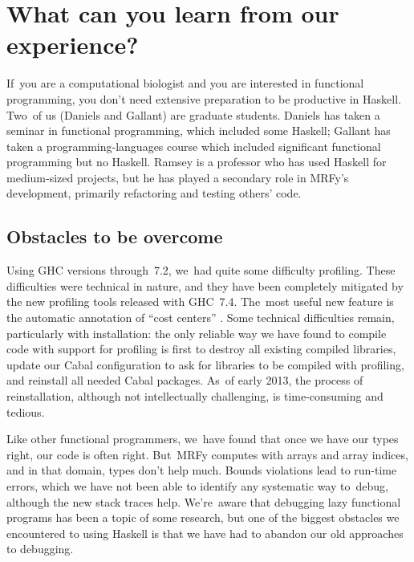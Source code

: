 \documentclass[]{jfp1}
\newcommand\mrfy{MRFy} %
\let\cite\citep
\begin{document}
\section{What can you learn from our experience?}

If~you are a computational biologist and you are interested in
functional programming, you don't need extensive preparation
to be productive in Haskell.
Two~of us (Daniels and Gallant) are graduate students.
Daniels has taken a seminar in functional programming, which
included some Haskell;
Gallant has taken a programming-languages course which included
significant functional programming but no Haskell.
Ramsey is a professor who has used Haskell 
for medium-sized projects,
but he has played a secondary role in \mrfy's development, primarily
refactoring and testing 
others' code. 


\subsection{Obstacles to be overcome}

Using GHC versions through~7.2, 
we~had quite some difficulty profiling.
These difficulties were technical in nature, and they have been
completely mitigated by the new profiling tools released 
with
GHC~7.4.
The~most useful new feature is the automatic annotation of ``cost
centers'' \cite{sansom-pj}. 
Some technical difficulties remain, particularly with installation:
the only reliable way we have found to compile code with support for
profiling is first to destroy all existing compiled libraries, 
update our Cabal configuration to ask for libraries to be compiled
with profiling, and reinstall all needed Cabal packages.
As~of early 2013, the process of reinstallation, although not
intellectually challenging, is time-consuming and tedious.

Like other functional programmers, we~have found that 
once we have our types right, our code is often right.
But~MRFy computes with arrays and array indices,
and in that domain, types don't help much.
Bounds violations lead to run-time errors, which we have not been able
to identify any systematic way to~debug, although the new stack traces help.
We're~aware that debugging lazy functional programs has been a topic
of some research,
but one of the biggest obstacles we encountered to using Haskell is
that we have had to abandon our old approaches to debugging.
\end{document}
